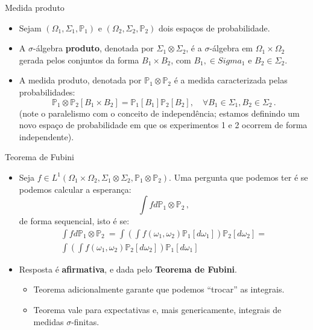 \documentclass[11pt]{beamer}
\begin{document}
\begin{frame}{Medida produto}
	\begin{itemize}
		\item Sejam $(\Omega_1,\Sigma_1,\mathbb{P}_1)$ e $(\Omega_2,\Sigma_2,\mathbb{P}_2)$ dois espaços de probabilidade.
		\item A $\sigma$-álgebra \textbf{produto}, denotada por $\Sigma_1 \otimes \Sigma_2 $, é a $\sigma$-álgebra em $\Omega_1 \times \Omega_2$ gerada pelos conjuntos da forma $B_1 \times B_2$, com $B_1, \in Sigma_1$ e $B_2 \in \Sigma_2$.
		\item A medida produto, denotada por $\mathbb{P}_1\otimes \mathbb{P}_2$ é a medida caracterizada pelas probabilidades:
		$$\mathbb{P}_1\otimes \mathbb{P}_2[B_1 \times B_2] = \mathbb{P}_1[B_1] \mathbb{P}_2[B_2],\quad \forall B_1 \in \Sigma_1,B_2 \in \Sigma_2\,.$$
		(note o paralelismo com o conceito de independência; estamos definindo um novo espaço de probabilidade em que os experimentos 1 e 2 ocorrem de forma independente).
	
	\end{itemize} 
\end{frame}
\begin{frame}{Teorema de Fubini}
	\begin{itemize}
	\item Seja $f \in L^1(\Omega_1\times \Omega_2,\Sigma_1 \otimes \Sigma_2,  \mathbb{P}_1\otimes \mathbb{P}_2)$. Uma pergunta que podemos ter é se podemos calcular a esperança:
$$\int f d \mathbb{P}_1 \otimes \mathbb{P}_2\,,$$
de forma sequencial, isto é se:
\begin{equation*}
	\begin{aligned}
		\int f d \mathbb{P}_1 \otimes \mathbb{P}_2\ = \int \left(\int f(\omega_1,\omega_2)\mathbb{P}_1[d\omega_1]\right) \mathbb{P}_2[d\omega_2] = \\ \int \left(\int f(\omega_1,\omega_2)\mathbb{P}_2[d\omega_2]\right) \mathbb{P}_1[d\omega_1] 
	\end{aligned}
\end{equation*}
\item Resposta é \textbf{afirmativa}, e dada pelo \textbf{Teorema de Fubini}.
\begin{itemize}
	\item Teorema adicionalmente garante que podemos ``trocar'' as integrais.
	\item Teorema vale para expectativas e, mais genericamente, integrais de medidas $\sigma$-finitas.
\end{itemize}
\end{itemize}
\end{frame}
\end{document}
